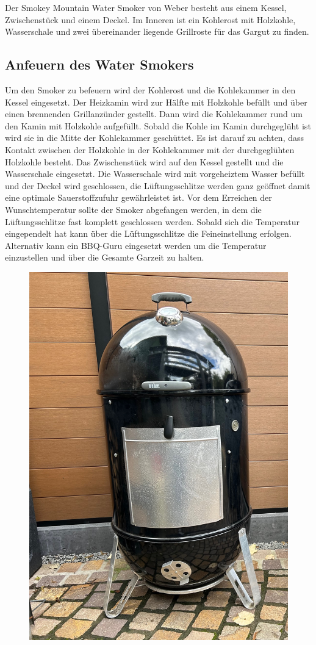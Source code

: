 	Der Smokey Mountain Water Smoker von Weber besteht aus einem Kessel, 
	Zwischenstück und einem Deckel. Im Inneren ist 
	ein Kohlerost mit Holzkohle, 
	Wasserschale und zwei übereinander liegende Grillroste für das Gargut zu 
	finden.

\subsection{Anfeuern des Water Smokers}

	Um den Smoker zu befeuern wird der Kohlerost und die Kohlekammer in den 
	Kessel eingesetzt. Der Heizkamin wird zur 
	Hälfte mit Holzkohle befüllt und über 
	einen brennenden Grillanzünder gestellt. Dann wird die Kohlekammer rund um 
	den Kamin mit Holzkohle aufgefüllt. Sobald die 
	Kohle im Kamin durchgeglüht ist 
	wird sie in die Mitte der Kohlekammer geschüttet. Es ist darauf zu achten, dass 
	Kontakt zwischen der Holzkohle in der 
	Kohlekammer mit der durchgeglühten 
	Holzkohle besteht. Das Zwischenstück wird auf den Kessel gestellt und die 
	Wasserschale eingesetzt. Die Wasserschale wird 
	mit vorgeheiztem Wasser befüllt 
	und der Deckel wird geschlossen, die Lüftungsschlitze werden ganz geöffnet 
	damit eine optimale Sauerstoffzufuhr 
	gewährleistet ist. Vor dem Erreichen der 
	Wunschtemperatur sollte der Smoker abgefangen werden, in dem die 
	Lüftungsschlitze fast komplett geschlossen werden. 
	Sobald sich die Temperatur 
	eingependelt hat kann über die Lüftungsschlitze die Feineinstellung erfolgen. 
	Alternativ kann ein BBQ-Guru eingesetzt 
	werden um die Temperatur einzustellen 
	und über die Gesamte Garzeit zu halten.
	
		\begin{figure}[htbp]
		\centering
		\begin{minipage}{1\textwidth}
			\centering
			\includegraphics[width=.8\linewidth]{pics/Smoker}
			\label{fig:Smoker}
		\end{minipage}%
	\end{figure}
	\newpage
	